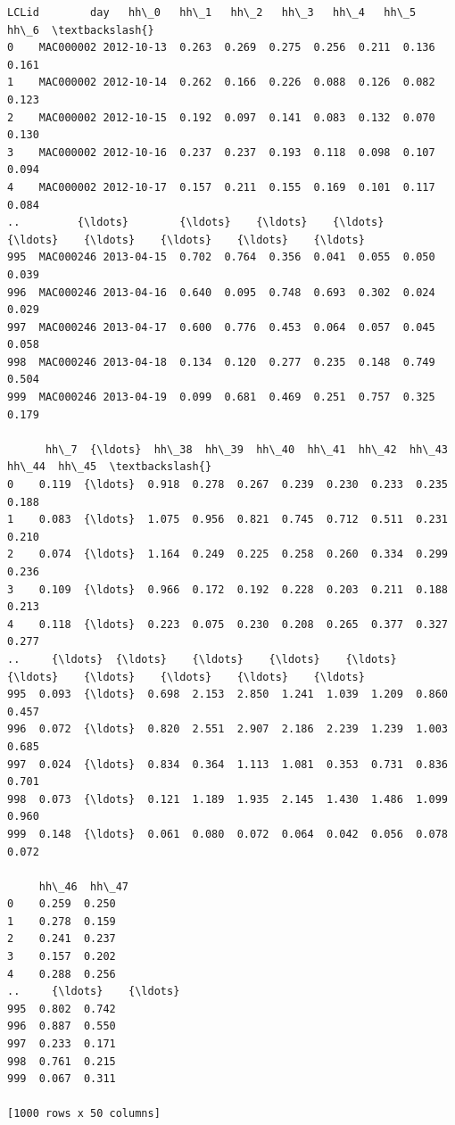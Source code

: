 \documentclass[11pt]{article}
\makeatletter
\newcommand{\boxspacing}{\kern\kvtcb@left@rule\kern\kvtcb@boxsep}
\newcommand{\prompt}[4]{
        {\ttfamily\llap{{\color{#2}[#3]:\hspace{3pt}#4}}\vspace{-\baselineskip}}
    }
\makeatother
\begin{document}
            \begin{tcolorbox}[breakable, size=fbox, boxrule=.5pt, pad at break*=1mm, opacityfill=0]
\prompt{Out}{outcolor}{59}{\boxspacing}
\begin{Verbatim}[commandchars=\\\{\}]
         LCLid        day   hh\_0   hh\_1   hh\_2   hh\_3   hh\_4   hh\_5   hh\_6  \textbackslash{}
0    MAC000002 2012-10-13  0.263  0.269  0.275  0.256  0.211  0.136  0.161
1    MAC000002 2012-10-14  0.262  0.166  0.226  0.088  0.126  0.082  0.123
2    MAC000002 2012-10-15  0.192  0.097  0.141  0.083  0.132  0.070  0.130
3    MAC000002 2012-10-16  0.237  0.237  0.193  0.118  0.098  0.107  0.094
4    MAC000002 2012-10-17  0.157  0.211  0.155  0.169  0.101  0.117  0.084
..         {\ldots}        {\ldots}    {\ldots}    {\ldots}    {\ldots}    {\ldots}    {\ldots}    {\ldots}    {\ldots}
995  MAC000246 2013-04-15  0.702  0.764  0.356  0.041  0.055  0.050  0.039
996  MAC000246 2013-04-16  0.640  0.095  0.748  0.693  0.302  0.024  0.029
997  MAC000246 2013-04-17  0.600  0.776  0.453  0.064  0.057  0.045  0.058
998  MAC000246 2013-04-18  0.134  0.120  0.277  0.235  0.148  0.749  0.504
999  MAC000246 2013-04-19  0.099  0.681  0.469  0.251  0.757  0.325  0.179

      hh\_7  {\ldots}  hh\_38  hh\_39  hh\_40  hh\_41  hh\_42  hh\_43  hh\_44  hh\_45  \textbackslash{}
0    0.119  {\ldots}  0.918  0.278  0.267  0.239  0.230  0.233  0.235  0.188
1    0.083  {\ldots}  1.075  0.956  0.821  0.745  0.712  0.511  0.231  0.210
2    0.074  {\ldots}  1.164  0.249  0.225  0.258  0.260  0.334  0.299  0.236
3    0.109  {\ldots}  0.966  0.172  0.192  0.228  0.203  0.211  0.188  0.213
4    0.118  {\ldots}  0.223  0.075  0.230  0.208  0.265  0.377  0.327  0.277
..     {\ldots}  {\ldots}    {\ldots}    {\ldots}    {\ldots}    {\ldots}    {\ldots}    {\ldots}    {\ldots}    {\ldots}
995  0.093  {\ldots}  0.698  2.153  2.850  1.241  1.039  1.209  0.860  0.457
996  0.072  {\ldots}  0.820  2.551  2.907  2.186  2.239  1.239  1.003  0.685
997  0.024  {\ldots}  0.834  0.364  1.113  1.081  0.353  0.731  0.836  0.701
998  0.073  {\ldots}  0.121  1.189  1.935  2.145  1.430  1.486  1.099  0.960
999  0.148  {\ldots}  0.061  0.080  0.072  0.064  0.042  0.056  0.078  0.072

     hh\_46  hh\_47
0    0.259  0.250
1    0.278  0.159
2    0.241  0.237
3    0.157  0.202
4    0.288  0.256
..     {\ldots}    {\ldots}
995  0.802  0.742
996  0.887  0.550
997  0.233  0.171
998  0.761  0.215
999  0.067  0.311

[1000 rows x 50 columns]
\end{Verbatim}
\end{tcolorbox}
        
\end{document}
